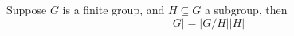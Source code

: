 \documentclass{article}
\newcommand{\abs}[1]{\left|#1\right|}
\begin{document}
\begin{multicols}{3}
    \begin{tcolorbox}[colback=bg, colframe=bg_alt, coltitle=fg, title=Lagrange's Theorem, fonttitle=\bfseries]
      \color{fg}
      Suppose $G$ is a finite group, and $H \subseteq G$ a subgroup, then
      \begin{equation*}
        \abs{G}=\abs{G/H}\abs{H}
      \end{equation*}
    \end{tcolorbox}
  \end{multicols}
\end{document}
